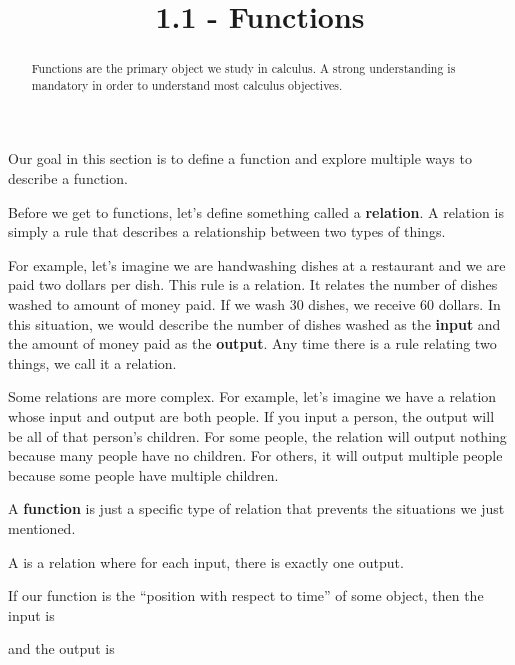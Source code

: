 \documentclass{ximera}
\title{1.1 - Functions}
\begin{document}
\begin{abstract}
Functions are the primary object we study in calculus. A strong understanding is mandatory in order to understand most calculus objectives.
\end{abstract}
\maketitle


Our goal in this section is to define a function and explore multiple ways to describe a function.

Before we get to functions, let's define something called a \textbf{relation}. A relation is simply a rule that describes a relationship between two types of things.

For example, let's imagine we are handwashing dishes at a restaurant and we are paid two dollars per dish. This rule is a relation. It relates the number of dishes washed to amount of money paid. If we wash 30 dishes, we receive 60 dollars. In this situation, we would describe the number of dishes washed as the \textbf{input} and the amount of money paid as the \textbf{output}. Any time there is a rule relating two things, we call it a relation.

Some relations are more complex. For example, let's imagine we have a relation whose input and output are both people. If you input a person, the output will be all of that person's children. For some people, the relation will output nothing because many people have no children. For others, it will output multiple people because some people have multiple children. 

A \textbf{function} is just a specific type of relation that prevents the situations we just mentioned.

\begin{definition}
A  is a relation where for each input,
there is exactly one output.
\end{definition}

\begin{question}
  If our function is the ``position with respect to time'' of some
  object, then the input is
  \begin{multipleChoice}
  \end{multipleChoice}
  and the output is
  \begin{multipleChoice}
  \end{multipleChoice}
\end{question}
\end{document}
